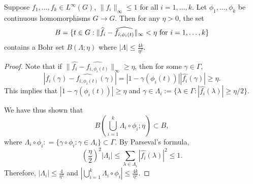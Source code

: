 \begin{lemma} \label{lem:translate}
Suppose $f_1, \ldots, f_k \in L^\infty(G)$, $\| f_i \|_{\infty} \leq 1$ for all $i=1, \ldots, k$. Let $\phi_1, \ldots, \phi_k$ be continuous homomorphisms $G \rightarrow G$. Then for any $\eta >0$, the set
\[
B = \{ t \in G: \| \widehat{f_i} - \widehat{f_{i, \phi_i(t)}} \|_{\infty} < \eta \textup{ for }i=1, \ldots, k \}
\]
contains a Bohr set $B(\Lambda; \eta)$ where $|\Lambda| \leq \frac{4k}{\eta^2}$.
\end{lemma}
\begin{proof}
Note that if $\| \widehat{f_i} - \widehat{f_{i, \phi_i(t)}} \|_\infty \geq \eta$, then for some $\gamma \in \Gamma$, 
\[
|\widehat{f_i}(\gamma) - \widehat{f_{i, \phi_i(t)}}(\gamma)| = |1 - \gamma(\phi_i(t))| |\widehat{f_i}(\gamma)| \geq \eta.
\]
This implies that $|1 - \gamma(\phi_i(t))| \geq \eta$ and $\gamma \in \Lambda_i := \{ \lambda \in \Gamma : |\widehat{f_i}(\lambda)| \geq \eta /2 \}$.

We have thus shown that 
\[
  B( \bigcup_{i=1}^k \Lambda_i \circ \phi_i; \eta) \subset B,  
\]
where $\Lambda_i \circ \phi_i: = \{ \gamma \circ \phi_i: \gamma \in \Lambda_i\} \subset \Gamma$. By  Parseval's formula, 
\[
\left( \frac{\eta}{2} \right)^2 |\Lambda_i| \leq \sum_{\lambda \in \Lambda_i} \left|\widehat{f_i}(\lambda)\right|^2 \leq 1.
\]
Therefore, $|\Lambda_i| \leq \frac{4}{\eta^2}$ and $|\bigcup_{i=1}^k \Lambda_i \circ \phi_i| \leq \frac{4k}{\eta^2}$.
\end{proof}

